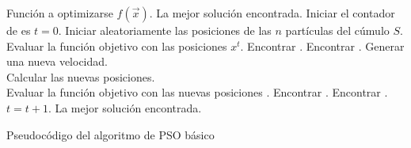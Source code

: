     \begin{algorithm}
    \begin{algorithmic}[1]
	\REQUIRE Funci\'on a optimizarse $f\left(\vec{x}\right)$.
	\ENSURE La mejor soluci\'on encontrada.
	\STATE Iniciar el contador de \DIFdelbegin {}\DIFdelend \DIFaddbegin {}\DIFaddend es $t=0$.
	\STATE Iniciar aleatoriamente las posiciones \DIFdelbegin {}\DIFdelend \DIFaddbegin {}\DIFaddend de las $n$ part\'iculas del c\'umulo $S$.
	\STATE Evaluar la funci\'on objetivo con las posiciones $x^{t}$.
	\STATE Encontrar \DIFdelbegin {}\DIFdelend \DIFaddbegin {}\DIFaddend . 
	\STATE Encontrar \DIFdelbegin {}\DIFdelend \DIFaddbegin {}\DIFaddend .
		  \STATE Generar una nueva velocidad.
		  \\ \DIFdelbegin {}\DIFdelend \DIFaddbegin {}\DIFaddend \STATE Calcular las nuevas posiciones. 
		  \\\DIFdelbegin {}\DIFdelend \DIFaddbegin {}\DIFaddend \STATE Evaluar la funci\'on objetivo con las nuevas posiciones \DIFdelbegin {}\DIFdelend \DIFaddbegin {}\DIFaddend .
		\ENDFOR
		\STATE Encontrar \DIFdelbegin {}\DIFdelend \DIFaddbegin {}\DIFaddend . 
		\STATE Encontrar \DIFdelbegin {}\DIFdelend \DIFaddbegin {}\DIFaddend .
		\STATE $t=t+1$.
	\ENDWHILE
	\RETURN La mejor soluci\'on encontrada.
	\end{algorithmic}
	\caption{Pseudoc\'odigo del algoritmo de PSO b\'asico}
	\label{alg:PSO}
	\end{algorithm}

